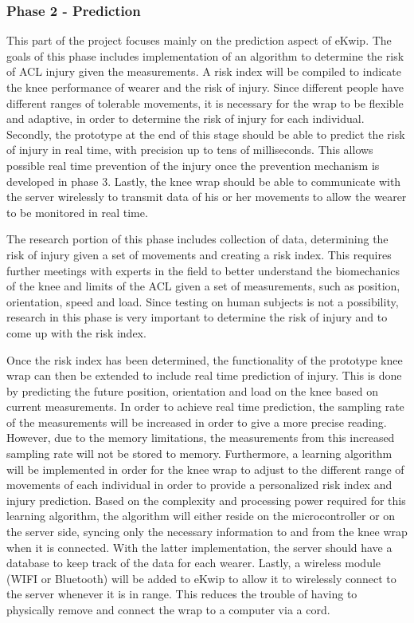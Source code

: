 \subsubsection{Phase 2 - Prediction}
This part of the project focuses mainly on the prediction aspect of eKwip. The goals of this phase includes implementation of an algorithm to determine the risk of ACL injury given the measurements. A risk index will be compiled to indicate the knee performance of wearer and the risk of injury. Since different people have different ranges of tolerable movements, it is necessary for the wrap to be flexible and adaptive, in order to determine the risk of injury for each individual. Secondly, the prototype at the end of this stage should be able to predict the risk of injury in real time, with precision up to tens of milliseconds. This allows possible real time prevention of the injury once the prevention mechanism is developed in phase 3. Lastly, the knee wrap should be able to communicate with the server wirelessly to transmit data of his or her movements to allow the wearer to be monitored in real time.

The research portion of this phase includes collection of data, determining the risk of injury given a set of movements and creating a risk index. This requires further meetings with experts in the field to better understand the biomechanics of the knee and limits of the ACL given a set of measurements, such as position, orientation, speed and load. Since testing on human subjects is not a possibility, research in this phase is very important to determine the risk of injury and to come up with the risk index.

Once the risk index has been determined, the functionality of the prototype knee wrap can then be extended to include real time prediction of injury. This is done by predicting the future position, orientation and load on the knee based on current measurements. In order to achieve real time prediction, the sampling rate of the measurements will be increased in order to give a more precise reading. However, due to the memory limitations, the measurements from this increased sampling rate will not be stored to memory. Furthermore, a learning algorithm will be implemented in order for the knee wrap to adjust to the different range of movements of each individual in order to provide a personalized risk index and injury prediction. Based on the complexity and processing power required for this learning algorithm, the algorithm will either reside on the microcontroller or on the server side, syncing only the necessary information to and from the knee wrap when it is connected. With the latter implementation, the server should have a database to keep track of the data for each wearer. Lastly, a wireless module (WIFI or Bluetooth) will be added to eKwip to allow it to wirelessly connect to the server whenever it is in range. This reduces the trouble of having to physically remove and connect the wrap to a computer via a cord.


